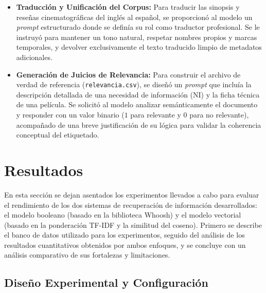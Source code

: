 \documentclass[conference,a4paper]{IEEEtran}
\begin{document}
\begin{itemize}
    \item \textbf{Traducción y Unificación del Corpus:} Para traducir las sinopsis y reseñas cinematográficas del inglés al español, se proporcionó al modelo un \textit{prompt} estructurado donde se definía su rol como traductor profesional. Se le instruyó para mantener un tono natural, respetar nombres propios y marcas temporales, y devolver exclusivamente el texto traducido limpio de metadatos adicionales.
    \item \textbf{Generación de Juicios de Relevancia:} Para construir el archivo de verdad de referencia (\texttt{relevancia.csv}), se diseñó un \textit{prompt} que incluía la descripción detallada de una necesidad de información (NI) y la ficha técnica de una película. Se solicitó al modelo analizar semánticamente el documento y responder con un valor binario ($1$ para relevante y $0$ para no relevante), acompañado de una breve justificación de su lógica para validar la coherencia conceptual del etiquetado.
\end{itemize}

\section{Resultados}

En esta sección se dejan asentados los experimentos llevados a cabo para evaluar el rendimiento de los dos sistemas de recuperación de información desarrollados: el modelo booleano (basado en la biblioteca Whoosh) y el modelo vectorial (basado en la ponderación TF-IDF y la similitud del coseno). Primero se describe el banco de datos utilizado para los experimentos, seguido del análisis de los resultados cuantitativos obtenidos por ambos enfoques, y se concluye con un análisis comparativo de sus fortalezas y limitaciones.

\subsection{Diseño Experimental y Configuración}
\end{document}
